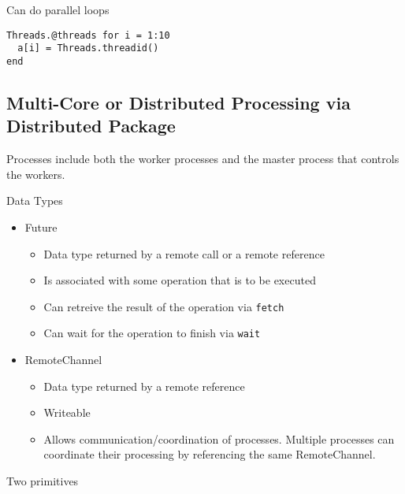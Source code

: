 \documentclass[12pt]{article}
\theoremstyle{plain}
\theoremstyle{definition}
\theoremstyle{remark}
\begin{document}
Can do parallel loops
\lstset{style=log}
\begin{lstlisting}
Threads.@threads for i = 1:10
  a[i] = Threads.threadid()
end
\end{lstlisting}






\subsection{Multi-Core or Distributed Processing via Distributed Package}

Processes include both the worker processes and the master process that
controls the workers.

Data Types
\begin{itemize}
  \item Future
    \begin{itemize}
      \item Data type returned by a remote call or a remote reference
      \item Is associated with some operation that is to be executed
      \item Can retreive the result of the operation via \texttt{fetch}
      \item Can wait for the operation to finish via \texttt{wait}
    \end{itemize}
  \item RemoteChannel
    \begin{itemize}
      \item Data type returned by a remote reference
      \item Writeable
      \item Allows communication/coordination of processes.  Multiple
        processes can coordinate their processing by referencing the
        same RemoteChannel.
    \end{itemize}
\end{itemize}
Two primitives
\end{document}
